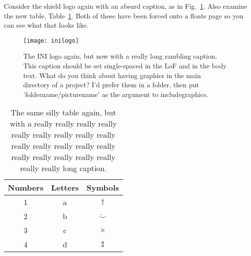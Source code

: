 Consider the shield logo again with an absurd caption, as in
Fig.~\ref{fig:shield}.
Also examine the new table, Table~\ref{tab:long-caption}.  Both of these
have been forced onto a floats page so you can see what that looks like.
\begin{figure}[p]
	\begin{center}
	\texttt{[image: inilogo]}
	\end{center}
	\caption{The INI logo again, but now with a really long rambling
	caption.  This caption should be set single-spaced in the LoF and in the
	body text.  What do you think about having graphics in the main directory
	of a project?  I'd prefer them in a folder, then put
	'foldername/picturename' as the argument to includegraphics.}
	\label{fig:shield}
\end{figure}
\begin{table}[p]
	\label{tab:long-caption}
	\begin{center}
		\begin{tabular}{c|c|c}
			\hline
			Numbers & Letters & Symbols \\ \hline
			1 & a & $\dagger$ \\
			2 & b & $\ddot \smile$ \\
			3 & c & $\times$ \\
			4 & d & $\sharp$ \\
	\end{tabular}
	\caption{The same silly table again, but with a really really really
	really really really
	really really really
	really really really
	really really really
	really really really
	really really really
	long caption.}
	\end{center}
\end{table}

